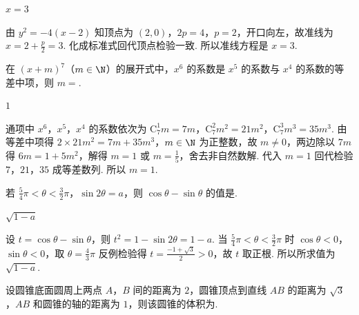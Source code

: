 \documentclass[UTF8,a4paper,oneside,11pt]{ctexbook}
\begin{document}
\begin{answer}
\(x=3\)
\end{answer}

\begin{solution}
由 \(y^{2}=-4\left( x-2 \right)\) 知顶点为 \((2,0)\)，\(2p=4\)，\(p=2\)，开口向左，故准线为 \(x=2+\frac{p}{2}=3\). 化成标准式回代顶点检验一致. 所以准线方程是 \(x=3\).
\end{solution}

\begin{problem}
在 \(\left( x+m \right)^{7}\)（\(m\in\N\)）的展开式中，\(x^{6}\) 的系数是 \(x^{5}\) 的系数与 \(x^{4}\) 的系数的等差中项，则 \(m=\)\fillinblank{}.
\end{problem}

\begin{answer}
\(1\)
\end{answer}

\begin{solution}
通项中 \(x^{6}\)，\(x^{5}\)，\(x^{4}\) 的系数依次为 \(\mathrm C_{7}^{1}m=7m\)，\(\mathrm C_{7}^{2}m^{2}=21m^{2}\)，\(\mathrm C_{7}^{3}m^{3}=35m^{3}\). 由等差中项得 \(2\times 21m^{2}=7m+35m^{3}\)，\(m\in\N\) 为正整数，故 \(m\ne 0\)，两边除以 \(7m\) 得 \(6m=1+5m^{2}\)，解得 \(m=1\) 或 \(m=\frac{1}{5}\)，舍去非自然数解. 代入 \(m=1\) 回代检验 \(7\)，\(21\)，\(35\) 成等差数列. 所以 \(m=1\).
\end{solution}

\begin{problem}
若 \(\frac{5}{4}\pi<\theta<\frac{3}{2}\pi\)，\(\sin 2\theta=a\)，则 \(\cos\theta-\sin\theta\) 的值是\fillinblank{}.
\end{problem}

\begin{answer}
\(\sqrt{1-a}\)
\end{answer}

\begin{solution}
设 \(t=\cos\theta-\sin\theta\)，则 \(t^{2}=1-\sin 2\theta=1-a\). 当 \(\frac{5}{4}\pi<\theta<\frac{3}{2}\pi\) 时 \(\cos\theta<0\)，\(\sin\theta<0\)，取 \(\theta=\frac{4}{3}\pi\) 反例检验得 \(t=\frac{-1+\sqrt{3}}{2}>0\)，故 \(t\) 取正根. 所以所求值为 \(\sqrt{1-a}\).
\end{solution}

\begin{problem}
设圆锥底面圆周上两点 \(A\)，\(B\) 间的距离为 \(2\)，圆锥顶点到直线 \(AB\) 的距离为 \(\sqrt{3}\)，\(AB\) 和圆锥的轴的距离为 \(1\)，则该圆锥的体积为\fillinblank{}.
\end{problem}
\end{document}
